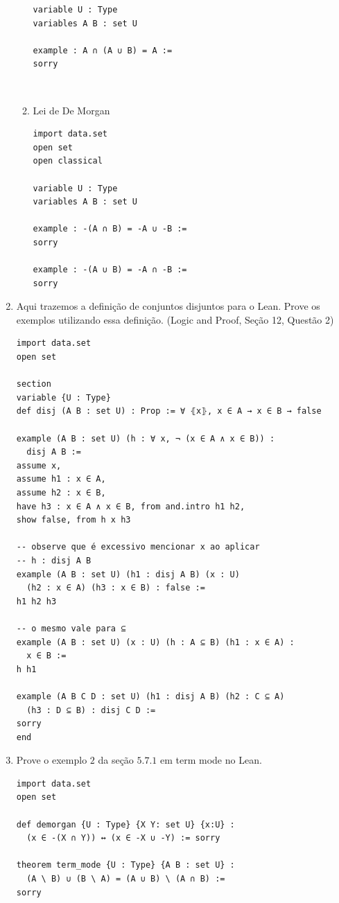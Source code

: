 \begin{enumerate}
\begin{enumerate}
\begin{lstlisting}
variable U : Type
variables A B : set U

example : A ∩ (A ∪ B) = A :=
sorry\end{lstlisting}

$\qquad$

\item Lei de De Morgan
\begin{lstlisting}
import data.set
open set
open classical

variable U : Type
variables A B : set U

example : -(A ∩ B) = -A ∪ -B :=
sorry

example : -(A ∪ B) = -A ∩ -B :=
sorry\end{lstlisting}

\end{enumerate}

\item Aqui trazemos a definição de conjuntos disjuntos para o Lean. Prove os exemplos utilizando essa definição. (Logic and Proof, Seção 12, Questão 2)
\begin{lstlisting}
import data.set
open set

section
variable {U : Type}
def disj (A B : set U) : Prop := ∀ ⦃x⦄, x ∈ A → x ∈ B → false

example (A B : set U) (h : ∀ x, ¬ (x ∈ A ∧ x ∈ B)) :
  disj A B :=
assume x,
assume h1 : x ∈ A,
assume h2 : x ∈ B,
have h3 : x ∈ A ∧ x ∈ B, from and.intro h1 h2,
show false, from h x h3

-- observe que é excessivo mencionar x ao aplicar
-- h : disj A B
example (A B : set U) (h1 : disj A B) (x : U)
  (h2 : x ∈ A) (h3 : x ∈ B) : false :=
h1 h2 h3

-- o mesmo vale para ⊆
example (A B : set U) (x : U) (h : A ⊆ B) (h1 : x ∈ A) :
  x ∈ B :=
h h1

example (A B C D : set U) (h1 : disj A B) (h2 : C ⊆ A)
  (h3 : D ⊆ B) : disj C D :=
sorry
end \end{lstlisting}

\item Prove o exemplo $2$ da seção $5.7.1$ em term mode no Lean.
\begin{lstlisting}
import data.set
open set

def demorgan {U : Type} {X Y: set U} {x:U} :
  (x ∈ -(X ∩ Y)) ↔ (x ∈ -X ∪ -Y) := sorry
  
theorem term_mode {U : Type} {A B : set U} :
  (A \ B) ∪ (B \ A) = (A ∪ B) \ (A ∩ B) :=
sorry
\end{lstlisting}


\end{enumerate}
